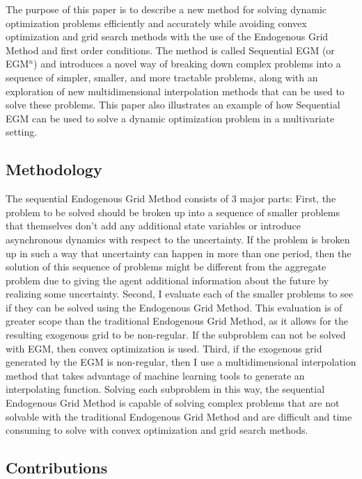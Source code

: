 \documentclass[\econtexRoot/SequentialEGM]{subfiles}
\begin{document}
The purpose of this paper is to describe a new method for solving dynamic optimization problems efficiently and accurately while avoiding convex optimization and grid search methods with the use of the Endogenous Grid Method and first order conditions. The method is called Sequential EGM (or EGM$^n$) and introduces a novel way of breaking down complex problems into a sequence of simpler, smaller, and more tractable problems, along with an exploration of new multidimensional interpolation methods that can be used to solve these problems. This paper also illustrates an example of how Sequential EGM can be used to solve a dynamic optimization problem in a multivariate setting.

\subsection{Methodology} %

The sequential Endogenous Grid Method consists of 3 major parts: First, the problem to be solved should be broken up into a sequence of smaller problems that themselves don't add any additional state variables or introduce asynchronous dynamics with respect to the uncertainty. If the problem is broken up in such a way that uncertainty can happen in more than one period, then the solution of this sequence of problems might be different from the aggregate problem due to giving the agent additional information about the future by realizing some uncertainty. Second, I evaluate each of the smaller problems to see if they can be solved using the Endogenous Grid Method. This evaluation is of greater scope than the traditional Endogenous Grid Method, as it allows for the resulting exogenous grid to be non-regular. If the subproblem can not be solved with EGM, then convex optimization is used. Third, if the exogenous grid generated by the EGM is non-regular, then I use a multidimensional interpolation method that takes advantage of machine learning tools to generate an interpolating function. Solving each subproblem in this way, the sequential Endogenous Grid Method is capable of solving complex problems that are not solvable with the traditional Endogenous Grid Method and are difficult and time consuming to solve with convex optimization and grid search methods.

\subsection{Contributions} %
\end{document}
